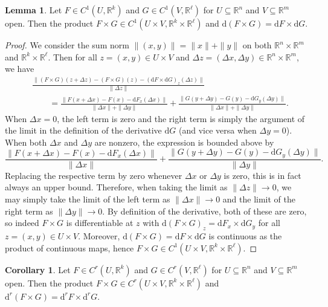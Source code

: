 \documentclass[12pt]{article}
\theoremstyle{definition}
\newtheorem{lemma}{Lemma}
\newtheorem{corollary}{Corollary}
\newcommand{\R}{\mathbb{R}}
\newcommand{\<}{\langle}
\renewcommand{\>}{\rangle}
\newcommand{\seq}{\subseteq}
\newcommand{\dd}{\mathrm{d}}
\begin{document}
\begin{lemma}\label{diff-prod}
    Let $F \in C^1(U, \R^k)$ and $G \in C^1(V, \R^\ell)$ for $U \seq \R^n$ and $V \seq \R^m$ open.
    Then the product $F \times G \in C^1(U \times V, \R^k \times \R^\ell)$ and $\dd(F \times G) = \dd{F} \times \dd{G}$.
\end{lemma}

\begin{proof}
    We consider the sum norm $\|(x, y)\| = \|x\| + \|y\|$ on both $\R^n \times \R^m$ and $\R^k \times \R^\ell$.
    Then for all $z = (x, y) \in U \times V$ and $\Delta z = (\Delta x, \Delta y) \in \R^n \times \R^m$, we have
    \begin{align*}
        &\frac{\|(F \times G)(z + \Delta z) - (F \times G)(z) - (\dd{F} \times \dd{G})_{z}(\Delta z)\|}{\|\Delta z\|} \\[2ex]
        & \hspace{2em} = \frac{\|F(x + \Delta x) - F(x) - \dd{F}_x(\Delta x)\|}{\|\Delta x\| + \|\Delta y\|} + \frac{\|G(y + \Delta y) - G(y) - \dd{G}_y(\Delta y)\|}{\|\Delta x\| +  \|\Delta y\|}.
    \end{align*}
    When $\Delta x = 0$, the left term is zero and the right term is simply the argument of the limit in the definition of the derivative $\dd{G}$ (and vice versa when $\Delta y = 0$).
    When both $\Delta x$ and $\Delta y$ are nonzero, the expression is bounded above by
    \[
        \frac{\|F(x + \Delta x) - F(x) - \dd{F}_x(\Delta x)\|}{\|\Delta x\|} + \frac{\|G(y + \Delta y) - G(y) - \dd{G}_y(\Delta y)\|}{\|\Delta y\|}.
    \]
    Replacing the respective term by zero whenever $\Delta x$ or $\Delta y$ is zero, this is in fact always an upper bound.
    Therefore, when taking the limit as $\|\Delta z\| \to 0$, we may simply take the limit of the left term as $\|\Delta x\| \to 0$ and the limit of the right term as $\|\Delta y\| \to 0$.
    By definition of the derivative, both of these are zero, so indeed $F \times G$ is differentiable at $z$ with $\dd(F \times G)_z = \dd{F}_x \times \dd{G}_y$ for all $z = (x, y) \in U \times V$.
    Moreover, $\dd(F \times G) = \dd{F} \times \dd{G}$ is continuous as the product of continuous maps, hence $F \times G \in C^1(U \times V, \R^k \times \R^\ell)$.
\end{proof}

\begin{corollary}
    Let $F \in C^r(U, \R^k)$ and $G \in C^r(V, \R^\ell)$ for $U \seq \R^n$ and $V \seq \R^m$ open.
    Then the product $F \times G \in C^r(U \times V, \R^k \times \R^\ell)$ and $\dd^r(F \times G) = \dd^r{F} \times \dd^r{G}$.
\end{corollary}
\end{document}
